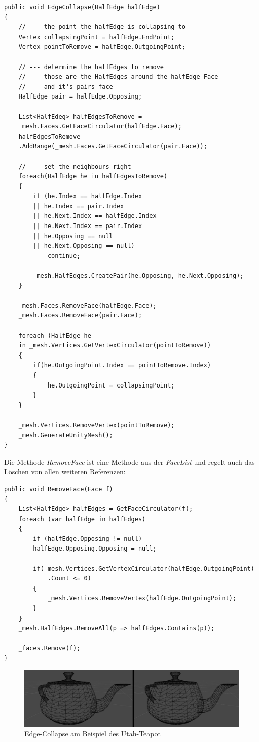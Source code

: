 \begin{lstlisting}
public void EdgeCollapse(HalfEdge halfEdge)
{
	// --- the point the halfEdge is collapsing to
	Vertex collapsingPoint = halfEdge.EndPoint;
	Vertex pointToRemove = halfEdge.OutgoingPoint;

	// --- determine the halfEdges to remove
	// --- those are the HalfEdges around the halfEdge Face 
	// --- and it's pairs face
	HalfEdge pair = halfEdge.Opposing;

	List<HalfEdeg> halfEdgesToRemove =
	_mesh.Faces.GetFaceCirculator(halfEdge.Face);
	halfEdgesToRemove
	.AddRange(_mesh.Faces.GetFaceCirculator(pair.Face));

	// --- set the neighbours right
	foreach(HalfEdge he in halfEdgesToRemove)
	{
		if (he.Index == halfEdge.Index 
		|| he.Index == pair.Index 
		|| he.Next.Index == halfEdge.Index 
		|| he.Next.Index == pair.Index
		|| he.Opposing == null 
		|| he.Next.Opposing == null)
			continue;

		_mesh.HalfEdges.CreatePair(he.Opposing, he.Next.Opposing);
	}

	_mesh.Faces.RemoveFace(halfEdge.Face);
	_mesh.Faces.RemoveFace(pair.Face);

	foreach (HalfEdge he 
	in _mesh.Vertices.GetVertexCirculator(pointToRemove))
	{
		if(he.OutgoingPoint.Index == pointToRemove.Index)
		{
			he.OutgoingPoint = collapsingPoint;
		}
	}

	_mesh.Vertices.RemoveVertex(pointToRemove);
	_mesh.GenerateUnityMesh();
}
\end{lstlisting}
Die Methode \textit{RemoveFace} ist eine Methode aus der \textit{FaceList} und regelt auch das L\"oschen von allen weiteren Referenzen:
\begin{lstlisting}
public void RemoveFace(Face f)
{
	List<HalfEdge> halfEdges = GetFaceCirculator(f);
	foreach (var halfEdge in halfEdges)
	{
		if (halfEdge.Opposing != null)
		halfEdge.Opposing.Opposing = null;

		if(_mesh.Vertices.GetVertexCirculator(halfEdge.OutgoingPoint)
			.Count <= 0)
		{
			_mesh.Vertices.RemoveVertex(halfEdge.OutgoingPoint);
		}
	}
	_mesh.HalfEdges.RemoveAll(p => halfEdges.Contains(p));

	_faces.Remove(f);
}
\end{lstlisting}
\begin{figure}[H]
	\centering
	\includegraphics[width=0.9\linewidth]{Images/EdgeCollapseDemo}
	\caption{Edge-Collapse am Beispiel des Utah-Teapot}
	\label{fig:edgecollapsedemo}
\end{figure}


